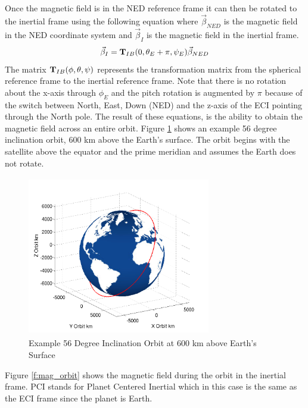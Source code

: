 \documentclass{article}
\begin{document}
Once the magnetic field is in the NED reference frame it can then be
rotated to the inertial frame using the following equation where $\vec{\beta}_{NED}$ is the
magnetic field in the NED coordinate system and $\vec{\beta}_I$ is the
magnetic field in the inertial frame. 
\begin{equation}\label{e:sph_inertial}
  \vec{\beta}_I = {\bf T}_{IB}(0,\theta_E+\pi,\psi_E)\vec{\beta}_{NED}
\end{equation}
The matrix ${\bf T}_{IB}(\phi,\theta,\psi)$ represents the transformation
matrix from the spherical reference frame to the inertial reference
frame. Note that there is no rotation about the x-axis through
$\phi_E$ and the pitch rotation is augmented by $\pi$ because of the
switch between North, East, Down (NED) and the z-axis of the ECI
pointing through the North pole. The result of these equations, is the
ability to obtain the magnetic field  
across an entire orbit. Figure \ref{f:orbit} shows an example 56
degree inclination orbit, 600 km above the Earth's surface. The orbit
begins with the satellite above the equator and the prime meridian and
assumes the Earth does not rotate.
\begin{figure}[H]
  \begin{center}
  \includegraphics[height=70mm, width=80mm]{Figures/Earth_Orbit.png}
  \end{center}
  \caption{Example 56 Degree Inclination Orbit at 600 km above Earth's
  Surface}\label{f:orbit}
\end{figure}
Figure \ref{f:mag_orbit} shows the magnetic field during the orbit in the
inertial frame. PCI stands for Planet Centered Inertial which in this
case is the same as the ECI frame since the planet is Earth. 
\end{document}
